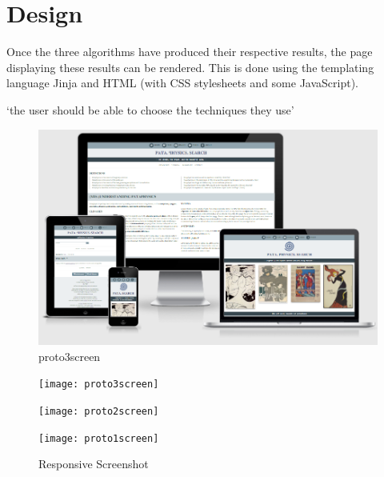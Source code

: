 \section{Design}

Once the three algorithms have produced their respective results, the page displaying these results can be rendered. This is done using the templating language Jinja and \ac{HTML} (with \ac{CSS} stylesheets and some JavaScript).

`the user should be able to choose the techniques they use' \autocite{Hendler2011}


\begin{figure}[!htbp] %
  \centering
  \includegraphics[width=\linewidth]{images/proto3screen}
\caption[proto3screen]{proto3screen}
\label{img:proto3screen}
\end{figure}

\begin{figure}[!htbp]
  \centering
  \begin{minipage}{\linewidth}
    \texttt{[image: proto3screen]}
  \end{minipage}
  \hspace{.05\linewidth}
  \begin{minipage}{\linewidth}
    \texttt{[image: proto2screen]}
  \end{minipage}
  \hspace{.05\linewidth}
  \begin{minipage}{\linewidth}
    \texttt{[image: proto1screen]}
  \end{minipage}
  \caption[responsive screenshots]{Responsive Screenshot}
\label{Respscreenshots}
\end{figure}

